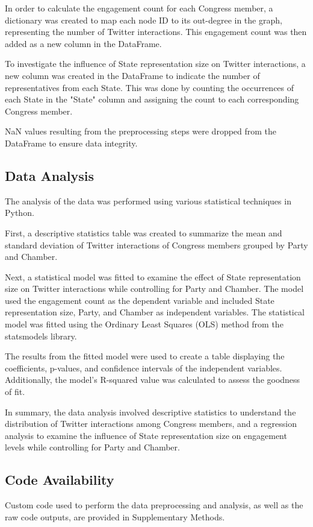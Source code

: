 \documentclass[11pt]{article}
\begin{document}
In order to calculate the engagement count for each Congress member, a dictionary was created to map each node ID to its out-degree in the graph, representing the number of Twitter interactions. This engagement count was then added as a new column in the DataFrame.

To investigate the influence of State representation size on Twitter interactions, a new column was created in the DataFrame to indicate the number of representatives from each State. This was done by counting the occurrences of each State in the "State" column and assigning the count to each corresponding Congress member.

NaN values resulting from the preprocessing steps were dropped from the DataFrame to ensure data integrity.

\subsection*{Data Analysis}
The analysis of the data was performed using various statistical techniques in Python. 

First, a descriptive statistics table was created to summarize the mean and standard deviation of Twitter interactions of Congress members grouped by Party and Chamber.

Next, a statistical model was fitted to examine the effect of State representation size on Twitter interactions while controlling for Party and Chamber. The model used the engagement count as the dependent variable and included State representation size, Party, and Chamber as independent variables. The statistical model was fitted using the Ordinary Least Squares (OLS) method from the statsmodels library.

The results from the fitted model were used to create a table displaying the coefficients, p-values, and confidence intervals of the independent variables. Additionally, the model's R-squared value was calculated to assess the goodness of fit.

In summary, the data analysis involved descriptive statistics to understand the distribution of Twitter interactions among Congress members, and a regression analysis to examine the influence of State representation size on engagement levels while controlling for Party and Chamber.\subsection*{Code Availability}

Custom code used to perform the data preprocessing and analysis, as well as the raw code outputs, are provided in Supplementary Methods.
\end{document}
